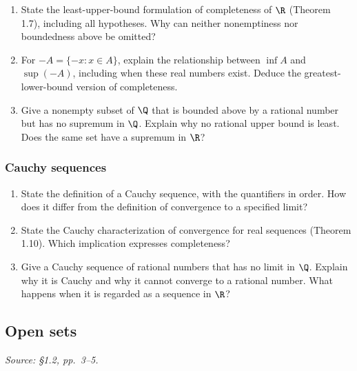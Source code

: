 \begin{enumerate}
  \item State the least-upper-bound formulation of completeness of \(\R\)
    (Theorem 1.7), including all hypotheses.
    Why can neither nonemptiness nor boundedness above be omitted?

  \item For \(-A=\{-x:x\in A\}\), explain the relationship between
    \(\inf A\) and \(\sup(-A)\), including when these real numbers exist.
    Deduce the greatest-lower-bound version of completeness.

  \item Give a nonempty subset of \(\Q\) that is bounded above by a rational
    number but has no supremum in \(\Q\). Explain why no rational upper bound
    is least. Does the same set have a supremum in \(\R\)?
\end{enumerate}

\subsubsection*{Cauchy sequences}
\begin{enumerate}[resume]
  \item State the definition of a Cauchy sequence, with the quantifiers
    in order. How does it differ from the definition of convergence
    to a specified limit?

  \item State the Cauchy characterization of convergence for real sequences
    (Theorem 1.10). Which implication expresses completeness?

  \item Give a Cauchy sequence of rational numbers that has no limit in
    \(\Q\). Explain why it is Cauchy and why it cannot converge to a
    rational number. What happens when it is regarded as a sequence in \(\R\)?
\end{enumerate}

\subsection{Open sets}
\textit{Source: \S1.2, pp.~3--5.}

